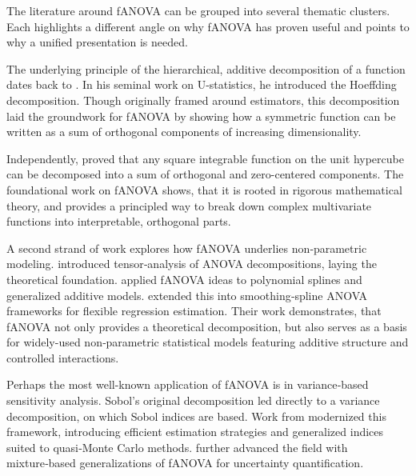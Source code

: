 The literature around fANOVA can be grouped into several thematic clusters. Each highlights a different angle on why fANOVA has proven useful and points to why a unified presentation is needed.\par

The underlying principle of the hierarchical, additive decomposition of a function dates back to \cite{hoeffding1948}. In his seminal work on U-statistics, he introduced the Hoeffding decomposition.
Though originally framed around estimators, this decomposition laid the groundwork for fANOVA by showing how a symmetric function can be written as a sum of orthogonal components of increasing dimensionality.\par
Independently, \cite{sobol1993sensitivity} proved that any square integrable function on the unit hypercube can be decomposed into a sum of orthogonal and zero-centered components.
The foundational work on fANOVA shows, that it is rooted in rigorous mathematical theory, and provides a principled way to break down complex multivariate functions into interpretable, orthogonal parts.\par

A second strand of work explores how fANOVA underlies non‑parametric modeling.
\citet{takemura1983} introduced tensor‑analysis of ANOVA decompositions, laying the theoretical foundation. \citet{stone1994} applied fANOVA ideas to polynomial splines and generalized additive models. \citet{gu2013} extended this into smoothing‑spline ANOVA frameworks for flexible regression estimation. Their work demonstrates, that fANOVA not only provides a theoretical decomposition, but also serves as a basis for widely-used non‑parametric statistical models featuring additive structure and controlled interactions.\par

Perhaps the most well-known application of fANOVA is in variance‑based sensitivity analysis. Sobol’s original decomposition led directly to a variance decomposition, on which Sobol indices are based.
Work from \cite{owen2013, owen2014} modernized this framework, introducing efficient estimation strategies and generalized indices suited to quasi‑Monte Carlo methods. \citet{borgonovo2022} further advanced the field with mixture‑based generalizations of fANOVA for uncertainty quantification.\par

